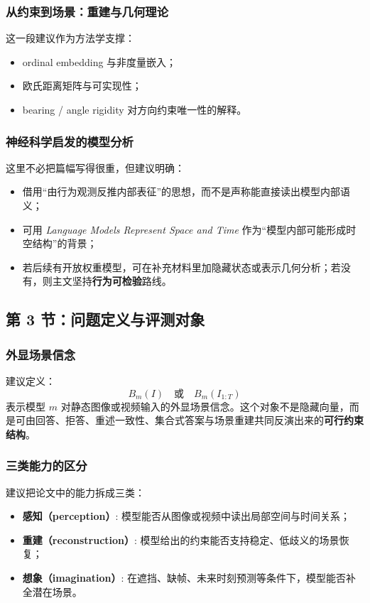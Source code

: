 \documentclass[UTF8,12pt,fontset=none]{ctexart}
\begin{document}
\subsubsection{从约束到场景：重建与几何理论}
这一段建议作为方法学支撑：
\begin{itemize}
  \item ordinal embedding 与非度量嵌入\cite{agarwal2007gnmds,ma2018robustordinal}；
  \item 欧氏距离矩阵与可实现性\cite{dokmanic2015edm}；
  \item bearing / angle rigidity 对方向约束唯一性的解释\cite{zhao2019bearingrigidity,chen2021anglerigidity}。
\end{itemize}

\subsubsection{神经科学启发的模型分析}
这里不必把篇幅写得很重，但建议明确：
\begin{itemize}
  \item 借用“由行为观测反推内部表征”的思想，而不是声称能直接读出模型内部语义；
  \item 可用 \textit{Language Models Represent Space and Time}\cite{gurnee2024spacetime} 作为“模型内部可能形成时空结构”的背景；
  \item 若后续有开放权重模型，可在补充材料里加隐藏状态或表示几何分析；若没有，则主文坚持\textbf{行为可检验}路线。
\end{itemize}

\subsection{第 3 节：问题定义与评测对象}

\subsubsection{外显场景信念}
建议定义：
\[
B_m(I) \quad \text{或} \quad B_m(I_{1:T})
\]
表示模型 $m$ 对静态图像或视频输入的外显场景信念。这个对象不是隐藏向量，而是可由回答、拒答、重述一致性、集合式答案与场景重建共同反演出来的\textbf{可行约束结构}。

\subsubsection{三类能力的区分}
建议把论文中的能力拆成三类：
\begin{itemize}
  \item \textbf{感知（perception）}: 模型能否从图像或视频中读出局部空间与时间关系；
  \item \textbf{重建（reconstruction）}: 模型给出的约束能否支持稳定、低歧义的场景恢复；
  \item \textbf{想象（imagination）}: 在遮挡、缺帧、未来时刻预测等条件下，模型能否补全潜在场景。
\end{itemize}
\end{document}
